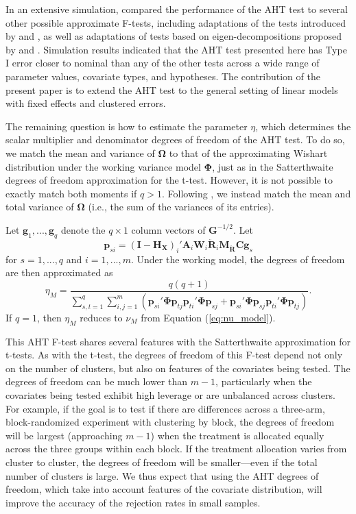 \documentclass[12pt]{article}\usepackage[]{graphicx}\usepackage[]{color}
\newcommand{\bm}{\mathbf}
\newcommand{\bs}{\boldsymbol}
\begin{document}
In an extensive simulation,  compared the performance of the AHT test to several other possible approximate F-tests, including adaptations of the tests introduced by \citet{Pan2002small} and \citet{Zhang2012twowayANOVA}, as well as adaptations of tests based on eigen-decompositions proposed by \citet{Fai1996approximate} and \citet{Cai2008new}.
Simulation results indicated that the AHT test presented here has Type I error closer to nominal than any of the other tests across a wide range of parameter values, covariate types, and hypotheses.
The contribution of the present paper is to extend the AHT test to the general setting of linear models with fixed effects and clustered errors. 

The remaining question is how to estimate the parameter $\eta$, which determines the scalar multiplier and denominator degrees of freedom of the AHT test. 
To do so, we match the mean and variance of $\bs\Omega$ to that of the approximating Wishart distribution under the working variance model $\bs\Phi$, just as in the Satterthwaite degrees of freedom approximation for the t-test. 
However, it is not possible to exactly match both moments if $q > 1$.
Following , we instead match the mean and total variance of $\bs\Omega$ (i.e., the sum of the variances of its entries).

Let $\bm{g}_1,...,\bm{g}_q$ denote the $q \times 1$ column vectors of $\bm{G}^{-1/2}$. 
Let \[
\bm{p}_{si} = \left(\bm{I} - \bm{H_X}\right)_i' \bm{A}_i \bm{W}_i \bm{\ddot{R}}_i \bm{M_{\ddot{R}}}\bm{C} \bm{g}_s \]
for $s = 1,...,q$ and $i = 1,...,m$.
Under the working model, the degrees of freedom are then approximated as
\begin{equation}
\label{eq:eta_model}
\eta_M = \frac{q(q + 1)}{\sum_{s,t=1}^q \sum_{i,j=1}^m \left(\bm{p}_{si}'\bs\Phi\bm{p}_{tj} \bm{p}_{ti}'\bs\Phi\bm{p}_{sj} + \bm{p}_{si}'\bs\Phi\bm{p}_{sj} \bm{p}_{ti}'\bs\Phi\bm{p}_{tj}\right)}.
\end{equation}
If $q = 1$, then $\eta_M$ reduces to $\nu_M$ from Equation (\ref{eq:nu_model}).

This AHT F-test shares several features with the Satterthwaite approximation for t-tests. As with the t-test, the degrees of freedom of this F-test depend not only on the number of clusters, but also on features of the covariates being tested. 
The degrees of freedom can be much lower than $m - 1$, particularly when the covariates being tested exhibit high leverage or are unbalanced across clusters. 
For example, if the goal is to test if there are differences across a three-arm, block-randomized experiment with clustering by block, the degrees of freedom will be largest (approaching $m - 1$) when the treatment is allocated equally across the three groups within each block. 
If the treatment allocation varies from cluster to cluster, the degrees of freedom will be smaller---even if the total number of clusters is large. 
We thus expect that using the AHT degrees of freedom, which take into account features of the covariate distribution, will improve the accuracy of the rejection rates in small samples. 
\end{document}
